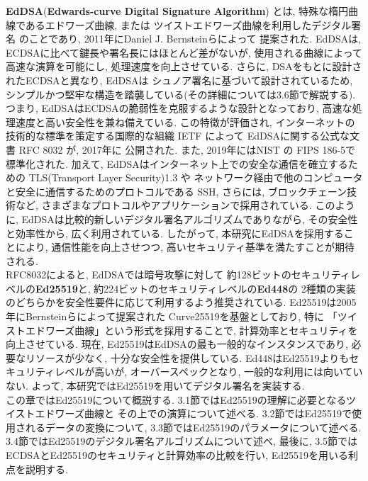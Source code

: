 \textbf{EdDSA}(\textbf{Edwards-curve Digital Signature Algorithm})
とは,  特殊な楕円曲線であるエドワーズ曲線, または
ツイストエドワーズ曲線\cite{twisted}を利用したデジタル署名
のことであり, 2011年にDaniel J. Bernsteinらによって
提案された\cite{high-speed}. 
EdDSAは, ECDSAに比べて鍵長や署名長にはほとんど差がないが, 
使用される曲線によって高速な演算を可能にし, 処理速度を向上させている. 
さらに, DSAをもとに設計されたECDSAと異なり, EdDSAは
シュノア署名\cite{schnorr}に基づいて設計されているため, 
シンプルかつ堅牢な構造を踏襲している(その詳細については3.6節で解説する). 
つまり, EdDSAはECDSAの脆弱性を克服するような設計となっており, 
高速な処理速度と高い安全性を兼ね備えている. この特徴が評価され, 
インターネットの技術的な標準を策定する国際的な組織 IETF によって
EdDSAに関する公式な文書 RFC 8032 \cite{8032}が, 2017年に
公開された. また, 2019年にはNIST の FIPS 186-5で標準化された. 
加えて, EdDSAはインターネット上での安全な通信を確立するための 
TLS(Transport Layer Security)1.3 \cite{rfc8446}や
ネットワーク経由で他のコンピュータと安全に通信するためのプロトコルである 
SSH, さらには, ブロックチェーン技術\cite{monero}など, 
さまざまなプロトコルやアプリケーションで採用されている. 
このように, EdDSAは比較的新しいデジタル署名アルゴリズムでありながら, 
その安全性と効率性から, 広く利用されている. 
したがって, 本研究にEdDSAを採用することにより, 通信性能を向上させつつ, 
高いセキュリティ基準を満たすことが期待される.\\
\indent RFC8032によると, EdDSAでは暗号攻撃に対して
約128ビットのセキュリティレベルの\textbf{Ed25519}と, 
約224ビットのセキュリティレベルの\textbf{Ed448}の
2種類の実装のどちらかを安全性要件に応じて利用するよう推奨されている. 
Ed25519は2005年にBernsteinらによって提案された
Curve25519\cite{curve25519}を基盤としており, 特に
「ツイストエドワーズ曲線」という形式を採用することで, 
計算効率とセキュリティを向上させている. 
現在, Ed25519はEdDSAの最も一般的なインスタンスであり, 
必要なリソースが少なく, 十分な安全性を提供している. 
Ed448はEd25519よりもセキュリティレベルが高いが, 
オーバースペックとなり, 一般的な利用には向いていない. 
よって, 本研究ではEd25519を用いてデジタル署名を実装する.\\
\indent この章ではEd25519について概説する. 
3.1節ではEd25519の理解に必要となるツイストエドワーズ曲線と
その上での演算について述べる. 
3.2節ではEd25519で使用されるデータの変換について, 
3.3節ではEd25519のパラメータについて述べる. 
3.4節ではEd25519のデジタル署名アルゴリズムについて述べ, 
最後に, 3.5節ではECDSAとEd25519のセキュリティと計算効率の比較を行い, 
Ed25519を用いる利点を説明する.\\
